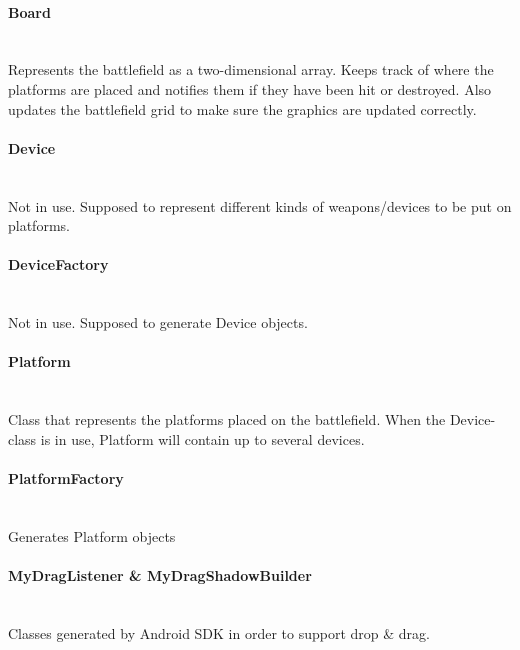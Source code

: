 \documentclass[12pt, a4paper]{article}
\begin{document}
\paragraph{Board} \\
	Represents the battlefield as a two-dimensional array. Keeps track of where the platforms are placed and notifies them if they have been hit or destroyed. Also updates the battlefield grid to make sure the graphics are updated correctly.

\paragraph{Device} \\
	 Not in use. Supposed to represent different kinds of weapons/devices to be put on platforms.

\paragraph{DeviceFactory} \\
	Not in use. Supposed to generate Device objects.

\paragraph{Platform} \\
	Class that represents the platforms placed on the battlefield. When the Device-class is in use, Platform will contain up to several devices.

\paragraph{PlatformFactory} \\
	Generates Platform objects

\paragraph{MyDragListener \& MyDragShadowBuilder} \\
	Classes generated by Android SDK in order to support drop & drag.
\end{document}
